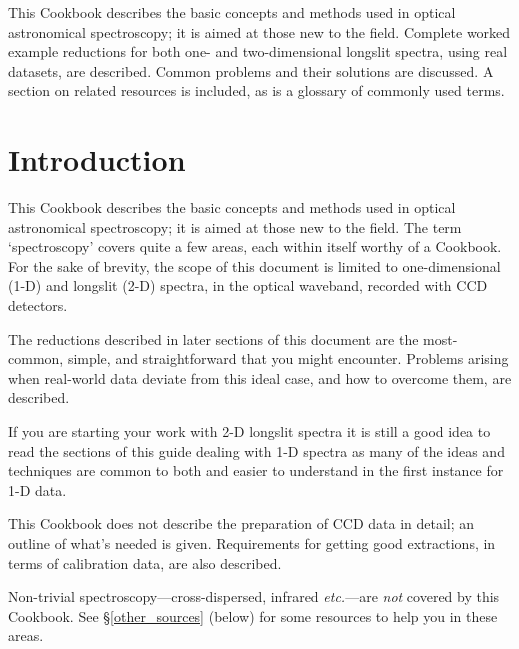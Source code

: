 \documentclass[twoside,11pt]{article}
\newcommand{\stardocinitials}  {SC}
\newcommand{\stardocnumber}    {7.2}
\newcommand{\stardocabstract}  {

This Cookbook describes the basic concepts and methods used in optical
astronomical spectroscopy; it is aimed at those new to the field.
Complete worked example reductions for both one- and two-dimensional 
longslit spectra, using real datasets, are described.  Common problems and
their solutions are discussed.  A section on related resources is
included, as is a glossary of commonly used terms.  }
\newcommand{\stardocname}{\stardocinitials /\stardocnumber}
\newenvironment{latexonly}{}{}
\newcommand{\htmlref}[2]{#1}
\newcommand{\xlabel}[1]{}
\newcommand{\mlabel}[1]{\xlabel{#1}\label{#1}}
\newcommand{\scspec}[2]{#1}
\newcommand{\scspec}[2]{#2}
\renewcommand{\thepage}{\roman{page}}
\begin{document}
\stardocabstract
\newpage
\begin{latexonly}
   \setlength{\parskip}{0mm}
   \tableofcontents
   \setlength{\parskip}{\medskipamount}
   \markright{\stardocname}
\end{latexonly}
\cleardoublepage
\renewcommand{\thepage}{\arabic{page}}
\setcounter{page}{1}


\section{\mlabel{introduction}Introduction}
\markboth{Introduction}{\stardocname}

This Cookbook describes the basic concepts and methods used in optical
astronomical spectroscopy; it is aimed at those new to the field.
The term `spectroscopy' covers quite a few areas, each within itself
worthy of a Cookbook.
For the sake of brevity, the scope of this document is limited to
one-dimensional (1-D) and longslit (2-D) spectra, in the optical 
waveband, recorded with \htmlref{CCD}{gl_ccd} detectors. 

The reductions described in later sections of this document are the
most-common, simple, and straightforward that you might encounter.
Problems arising when real-world data deviate from this ideal case,
and how to overcome them, are described.

If you are starting your work with 2-D longslit spectra it is still a
good idea to read the sections of this guide dealing with 1-D spectra
as many of the ideas and techniques are common to both and easier to
understand in the first instance for 1-D data.

This Cookbook does not describe the preparation of CCD data in detail;
an outline of what's needed is given.  Requirements for getting good
extractions, in terms of calibration data, are also described.

Non-trivial spectroscopy\scspec{---}{ - }cross-dispersed, infrared
{\it{etc.}}\scspec{---}{ - }are {\em not} covered by this Cookbook.
See \scspec{\S\ref{other_sources} (below)}{\htmlref{Other Sources of
Information}{other_sources}} for some resources to help you in these
areas.
\end{document}
